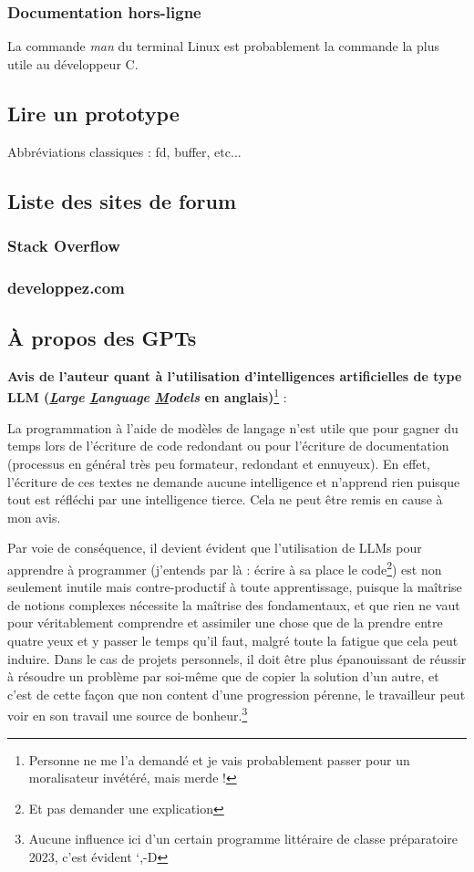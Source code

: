 \documentclass[../../../main.tex]{subfiles}
\begin{document}
\subsubsection{Documentation hors-ligne}
La commande \textit{man} du terminal Linux est probablement la commande la plus utile au développeur C.
\subsection{Lire un prototype}
	Abbréviations classiques : fd, buffer, etc...
\subsection{Liste des sites de forum}
	\subsubsection{Stack Overflow}
	\subsubsection{developpez.com}
\subsection{À propos des GPTs}
\textbf{Avis de l'auteur quant à l'utilisation d'intelligences artificielles de type LLM (\textit{\underline{L}arge \underline{L}anguage \underline{M}odels} en anglais)}\footnote{Personne ne me l'a demandé et je vais probablement passer pour un moralisateur invétéré, mais merde !} :
 
La programmation à l'aide de modèles de langage n'est utile que pour gagner du temps lors de l'écriture de code redondant ou pour l'écriture de documentation (processus en général très peu formateur, redondant et ennuyeux). En effet, l'écriture de ces textes ne demande aucune intelligence et n'apprend rien puisque tout est réfléchi par une intelligence tierce. Cela ne peut être remis en cause à mon avis.
 
Par voie de conséquence, il devient évident que l'utilisation de LLMs pour apprendre à programmer (j'entends par là : écrire à sa place le code\footnote{Et pas demander une explication}) est non seulement inutile mais contre-productif à toute apprentissage, puisque la maîtrise de notions complexes nécessite la maîtrise des fondamentaux, et que rien ne vaut pour véritablement comprendre et assimiler une chose que de la prendre entre quatre yeux et y passer le temps qu'il faut, malgré toute la fatigue que cela peut induire. Dans le cas de projets personnels, il doit être plus épanouissant de réussir à résoudre un problème par soi-même que de copier la solution d'un autre, et c'est de cette façon que non content d'une progression pérenne, le travailleur peut voir en son travail une source de bonheur.\footnote{Aucune influence ici d'un certain programme littéraire de classe préparatoire 2023, c'est évident `,-D}
 
\end{document}
